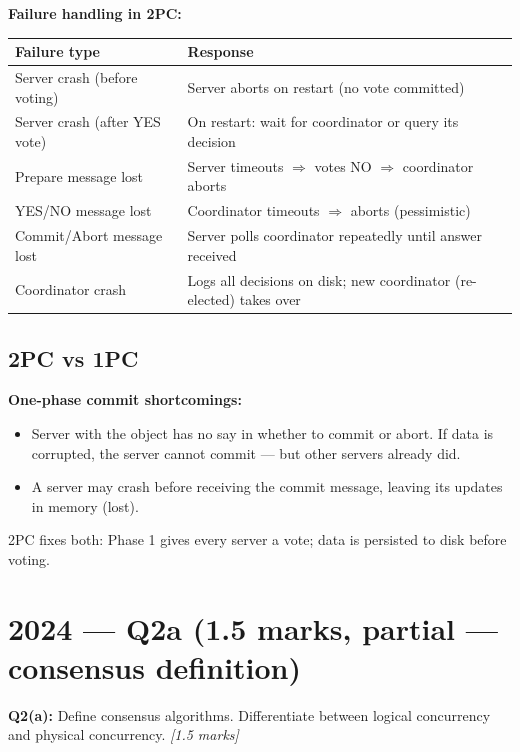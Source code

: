 \documentclass[12pt,a4paper]{article}
\begin{document}
\textbf{Failure handling in 2PC:}
\begin{center}
\renewcommand{\arraystretch}{1.2}
\begin{tabular}{ll}
\toprule
\textbf{Failure type} & \textbf{Response} \\
\midrule
Server crash (before voting) & Server aborts on restart (no vote committed) \\
Server crash (after YES vote) & On restart: wait for coordinator or query its decision \\
Prepare message lost & Server timeouts $\Rightarrow$ votes NO $\Rightarrow$ coordinator aborts \\
YES/NO message lost & Coordinator timeouts $\Rightarrow$ aborts (pessimistic) \\
Commit/Abort message lost & Server polls coordinator repeatedly until answer received \\
Coordinator crash & Logs all decisions on disk; new coordinator (re-elected) takes over \\
\bottomrule
\end{tabular}
\end{center}

\subsection{2PC vs 1PC}
\textbf{One-phase commit shortcomings:}
\begin{itemize}
  \item Server with the object has no say in whether to commit or abort.
        If data is corrupted, the server cannot commit — but other servers already did.
  \item A server may crash before receiving the commit message, leaving its updates in memory (lost).
\end{itemize}
2PC fixes both: Phase 1 gives every server a vote; data is persisted to disk before voting.

\newpage
\section{2024 — Q2a (1.5 marks, partial — consensus definition)}

\begin{qbox}
\textbf{Q2(a):} Define consensus algorithms. Differentiate between logical concurrency
and physical concurrency. \hfill \textit{[1.5 marks]}
\end{qbox}
\end{document}
